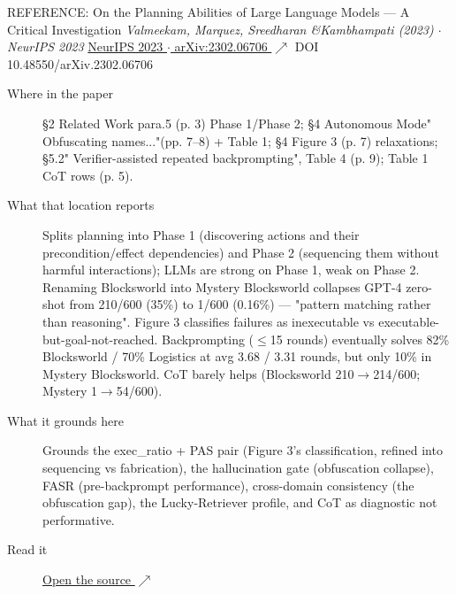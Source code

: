 \begin{bmmcard}{REFERENCE: On the Planning Abilities of Large Language Models --- A Critical Investigation}
\emph{Valmeekam, Marquez, Sreedharan \&Kambhampati (2023) \(\cdot\) NeurIPS 2023}
\href{https://proceedings.neurips.cc/paper_files/paper/2023/file/efb2072a358cefb75886a315a6fcf880-Paper-Conference.pdf}{NeurIPS 2023 \(\cdot\) arXiv:2302.06706 \(\nearrow\)} DOI 10.48550/arXiv.2302.06706
\begin{description}
\item[Where in the paper] \S{}2 Related Work para.5 (p. 3) Phase 1/Phase 2; \S{}4 Autonomous Mode" Obfuscating names..."(pp. 7--8) + Table 1; \S{}4 Figure 3 (p. 7) relaxations; \S{}5.2" Verifier-assisted repeated backprompting", Table 4 (p. 9); Table 1 CoT rows (p. 5).
\item[What that location reports] Splits planning into Phase 1 (discovering actions and their precondition/effect dependencies) and Phase 2 (sequencing them without harmful interactions); LLMs are strong on Phase 1, weak on Phase 2. Renaming Blocksworld into Mystery Blocksworld collapses GPT-4 zero-shot from 210/600 (35\%) to 1/600 (0.16\%) --- "pattern matching rather than reasoning". Figure 3 classifies failures as inexecutable vs executable-but-goal-not-reached. Backprompting (\(\le\)15 rounds) eventually solves 82\% Blocksworld / 70\% Logistics at avg 3.68 / 3.31 rounds, but only 10\% in Mystery Blocksworld. CoT barely helps (Blocksworld 210\(\rightarrow\)214/600; Mystery 1\(\rightarrow\)54/600).
\item[What it grounds here] Grounds the exec\_ratio + PAS pair (Figure 3's classification, refined into sequencing vs fabrication), the hallucination gate (obfuscation collapse), FASR (pre-backprompt performance), cross-domain consistency (the obfuscation gap), the Lucky-Retriever profile, and CoT as diagnostic not performative.
\item[Read it] \href{https://proceedings.neurips.cc/paper_files/paper/2023/file/efb2072a358cefb75886a315a6fcf880-Paper-Conference.pdf}{Open the source \(\nearrow\)}
\end{description}
\end{bmmcard}

